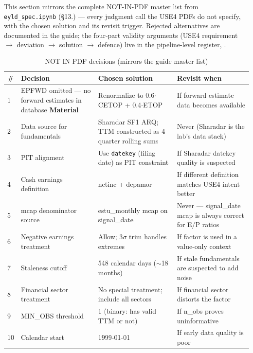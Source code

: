 \documentclass[11pt,a4paper]{article}
\newcommand{\WARN}[1]{\textcolor{warn}{\textbf{#1}}}
\begin{document}
This section mirrors the complete NOT-IN-PDF master list from
\texttt{eyld\_spec.ipynb} (\S13.) --- every judgment call the USE4 PDFs do not
specify, with the chosen solution and its revisit trigger. Rejected alternatives
are documented in the guide; the four-part validity arguments (USE4 requirement
$\to$ deviation $\to$ solution $\to$ defence) live in the pipeline-level
register, .

\begin{longtable}{@{}p{0.5cm}p{3.6cm}p{6.0cm}p{3.8cm}@{}}
\caption{NOT-IN-PDF decisions (mirrors the guide master list)}\\
\toprule
\textbf{\#} & \textbf{Decision} & \textbf{Chosen solution} & \textbf{Revisit when} \\
\midrule
\endhead
1 & EPFWD omitted --- no forward estimates in database \WARN{Material} & Renormalize to 0.6$\cdot$CETOP + 0.4$\cdot$ETOP & If forward estimate data becomes available \\[3pt]
2 & Data source for fundamentals & Sharadar SF1 ARQ; TTM constructed as 4-quarter rolling sums & Never (Sharadar is the lab's data stack) \\[3pt]
3 & PIT alignment & Use \texttt{datekey} (filing date) as PIT constraint & If Sharadar datekey quality is suspected \\[3pt]
4 & Cash earnings definition & netinc + depamor & If different definition matches USE4 intent better \\[3pt]
5 & mcap denominator source & estu\_monthly mcap on signal\_date & Never --- signal\_date mcap is always correct for E/P ratios \\[3pt]
6 & Negative earnings treatment & Allow; 3$\sigma$ trim handles extremes & If factor is used in a value-only context \\[3pt]
7 & Staleness cutoff & 548 calendar days ($\sim$18 months) & If stale fundamentals are suspected to add noise \\[3pt]
8 & Financial sector treatment & No special treatment; include all sectors & If financial sector distorts the factor \\[3pt]
9 & MIN\_OBS threshold & 1 (binary: has valid TTM or not) & If n\_obs proves uninformative \\[3pt]
10 & Calendar start & 1999-01-01 & If early data quality is poor \\[3pt]
\bottomrule
\end{longtable}

\end{document}
